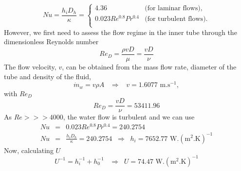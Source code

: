 \documentclass[calculator,datasheet,handbook,solutions]{exam}
\begin{document}
\begin{question}
\begin{enumerate}
{         \begin{displaymath}
                Nu = \frac{h_{i}D_{h}}{\kappa} =
                     \begin{cases}
                         4.36  & \text{(for laminar flows),} \\
                         0.023 Re^{0.8} Pr^{0.4} & \text{(for turbulent flows).} \\
                     \end{cases}
         \end{displaymath}
         However, we first need to assess the flow regime in the inner tube through the dimensionless Reynolds number
         \begin{displaymath}
           Re_{D} = \frac{\rho v D}{\mu} = \frac{v D}{\nu}
         \end{displaymath}
         The flow velocity, $v$, can be obtained from the mass flow rate, diameter of the tube and density of the fluid,~
         \begin{displaymath}
           \dot{m}_{w} = v\rho A \;\;\;\Longrightarrow\;\;\; v = 1.6077\text{ m.s}^{-1},
         \end{displaymath}
         with $Re_{D}$~
         \begin{displaymath}
           Re_{D} = \frac{v D}{\nu} = 53411.96
         \end{displaymath}
         As $Re >>> 4000$, the water flow is turbulent and we can use~ 
         \begin{eqnarray}
           Nu &=& 0.023 Re^{0.8} Pr^{0.4} = 240.2754 \nonumber \\
           Nu &=& \frac{h_{i}D_{h}}{\kappa} = 240.2754 \;\;\Longrightarrow \;\; h_{i} = 7652.77 \text{ W.}\left(\text{m}^{2}.\text{K}\right)^{-1} \nonumber
         \end{eqnarray}
         Now, calculating $U$~ 
           \begin{displaymath}
             U^{-1} = h_{i}^{-1} + h_{0}^{-1} \;\;\;\Longrightarrow\;\; U =74.47 \text{ W.}\left(\text{m}^{2}.\text{K}\right)^{-1}
           \end{displaymath}
         
         
         }
         

\end{enumerate}
\end{question}
\end{document}
